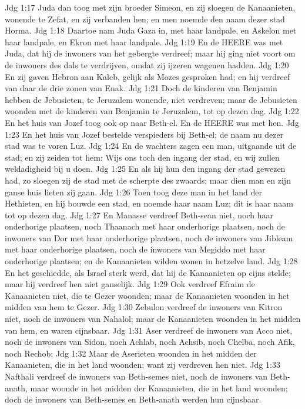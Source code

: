 Jdg 1:17  Juda dan toog met zijn broeder Simeon, en zij sloegen de Kanaanieten, wonende te Zefat, en zij verbanden hen; en men noemde den naam dezer stad Horma.
Jdg 1:18  Daartoe nam Juda Gaza in, met haar landpale, en Askelon met haar landpale, en Ekron met haar landpale.
Jdg 1:19  En de HEERE was met Juda, dat hij de inwoners van het gebergte verdreef; maar hij ging niet voort om de inwoners des dals te verdrijven, omdat zij ijzeren wagenen hadden.
Jdg 1:20  En zij gaven Hebron aan Kaleb, gelijk als Mozes gesproken had; en hij verdreef van daar de drie zonen van Enak.
Jdg 1:21  Doch de kinderen van Benjamin hebben de Jebusieten, te Jeruzalem wonende, niet verdreven; maar de Jebusieten woonden met de kinderen van Benjamin te Jeruzalem, tot op dezen dag.
Jdg 1:22  En het huis van Jozef toog ook op naar Beth-el. En de HEERE was met hen.
Jdg 1:23  En het huis van Jozef bestelde verspieders bij Beth-el; de naam nu dezer stad was te voren Luz.
Jdg 1:24  En de wachters zagen een man, uitgaande uit de stad; en zij zeiden tot hem: Wijs ons toch den ingang der stad, en wij zullen weldadigheid bij u doen.
Jdg 1:25  En als hij hun den ingang der stad gewezen had, zo sloegen zij de stad met de scherpte des zwaards; maar dien man en zijn ganse huis lieten zij gaan.
Jdg 1:26  Toen toog deze man in het land der Hethieten, en hij bouwde een stad, en noemde haar naam Luz; dit is haar naam tot op dezen dag.
Jdg 1:27  En Manasse verdreef Beth-sean niet, noch haar onderhorige plaatsen, noch Thaanach met haar onderhorige plaatsen, noch de inwoners van Dor met haar onderhorige plaatsen, noch de inwoners van Jibleam met haar onderhorige plaatsen, noch de inwoners van Megiddo met haar onderhorige plaatsen; en de Kanaanieten wilden wonen in hetzelve land.
Jdg 1:28  En het geschiedde, als Israel sterk werd, dat hij de Kanaanieten op cijns stelde; maar hij verdreef hen niet ganselijk.
Jdg 1:29  Ook verdreef Efraim de Kanaanieten niet, die te Gezer woonden; maar de Kanaanieten woonden in het midden van hem te Gezer.
Jdg 1:30  Zebulon verdreef de inwoners van Kitron niet, noch de inwoners van Nahalol; maar de Kanaanieten woonden in het midden van hem, en waren cijnsbaar.
Jdg 1:31  Aser verdreef de inwoners van Acco niet, noch de inwoners van Sidon, noch Achlab, noch Achsib, noch Chelba, noch Afik, noch Rechob;
Jdg 1:32  Maar de Aserieten woonden in het midden der Kanaanieten, die in het land woonden; want zij verdreven hen niet.
Jdg 1:33  Nafthali verdreef de inwoners van Beth-semes niet, noch de inwoners van Beth-anath, maar woonde in het midden der Kanaanieten, die in het land woonden; doch de inwoners van Beth-semes en Beth-anath werden hun cijnsbaar.
